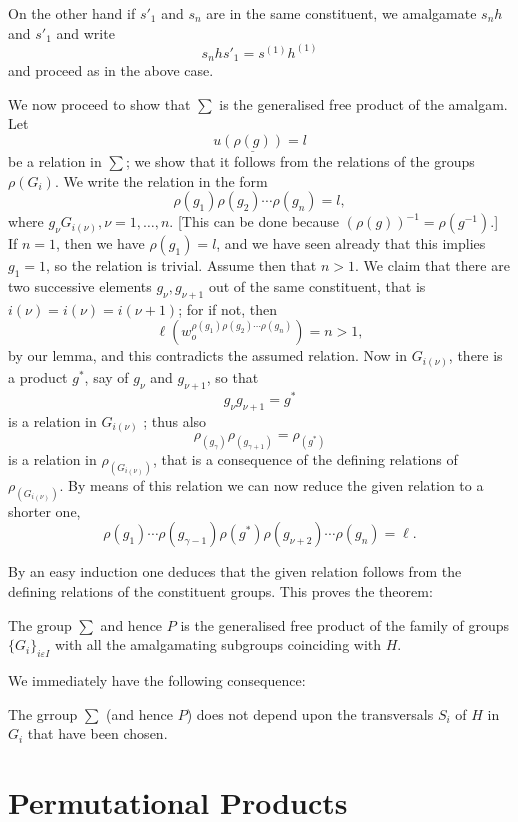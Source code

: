 On the other hand if $s'_1$ and $s_n$ are in the same constituent, we
amalgamate $s_n h$ and $s'_1$ and write 
$$
s_n hs'_1 = s^{(1)} h ^{(1)}
$$
and proceed as in the above case.	

We now proceed to show that $\sum$ is the generalised free product of
the amalgam. Let 
$$
u \underline{(\rho (g))} = l
$$
be a relation in $ \sum $; we show that it follows from the relations
of the groups $\rho (G_i)$. We write the relation in the form  
$$
\rho (g_1) \rho (g_2) \cdots \rho (g_n) = l,
$$
where $g_{\nu} G_{i (\nu)}, \nu = 1,  \ldots, n$. [This can be done
  because $(\rho (g))^{-1} = \rho (g^{-1})$.] If $n=1$, then we have
$\rho (g_1) = l$, and we have seen already that this implies $g_1 =
1$, so the relation is trivial. Assume then that $n > 1$. We claim
that there are two successive elements $g_{\nu}, g_{\nu +1}$ out of
the same constituent, that is $i (\nu) = i (\nu) = i (\nu +1)$; for if
not, then 
$$
\ell (w_o^{\rho (g_1) \rho (g_2) \cdots \rho (g_n)}) = n > 1,
$$
by our lemma, and this contradicts the assumed relation. Now in $G_{i
  (\nu)}$, there is a product $g^*$, say of $g_{\nu}$ and $g_{\nu
  +1}$, so that 
$$
g_\nu g _{ \nu + 1} = g^*
$$
is a relation in $G_{i (\nu)}$ ; thus also 
$$
\rho_{(g_\gamma)} \rho _{(g_{ \gamma + 1})} = \rho_ {(g^*)}
$$
is a relation in $\rho_{ (G_{i(\nu)})}$, that is a consequence of the
defining relations of $\rho_{ (G_{i(\nu)})}$. By means of this
relation we can now reduce the given relation to a shorter one,  
$$
 \rho (g_1) \cdots \rho ( g _{ \gamma - 1}) \rho (g^*) \rho (g_{\nu +
   2})\cdots \rho (g_n) = \ell. 
$$

By an easy induction one deduces that the given relation follows from
the defining relations of the constituent groups. This proves the
theorem:  

\begin{Theorem} %
  The group $\sum$ and hence $P$ is the generalised free product of
  the family of groups $\big\{G_i \big\}_{ i \varepsilon I}$ with all
  the amalgamating subgroups coinciding with $H$.  
\end{Theorem}

We immediately have the following consequence: 

\begin{corollary}%
  The grroup $\sum$ (and hence $P$) does not depend upon the
  transversals $S_i$ of $H$ in $G_i$ that have been chosen.  
\end{corollary}

\chapter{Permutational Products }%

